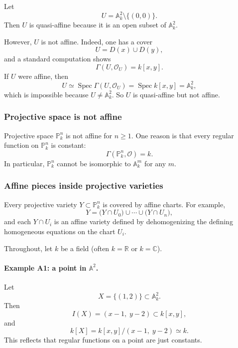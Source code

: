 \documentclass[12pt,a4paper]{article}
\theoremstyle{plain}
\theoremstyle{definition}      %
\begin{document}
Let
\[
U=\mathbb A^2_k\setminus\{(0,0)\}.
\]
Then \(U\) is quasi-affine because it is an open subset of \(\mathbb A^2_k\).

However, \(U\) is not affine.
Indeed, one has a cover
\[
U=D(x)\cup D(y),
\]
and a standard computation shows
\[
\Gamma(U,\mathcal O_U)=k[x,y].
\]
If \(U\) were affine, then
\[
U\simeq \operatorname{Spec}\Gamma(U,\mathcal O_U)=\operatorname{Spec}k[x,y]=\mathbb A^2_k,
\]
which is impossible because \(U\neq \mathbb A^2_k\).
So \(U\) is quasi-affine but not affine.

\subsubsection*{Projective space is not affine}

Projective space \(\mathbb P^n_k\) is not affine for \(n\ge 1\).
One reason is that every regular function on \(\mathbb P^n_k\) is constant:
\[
\Gamma(\mathbb P^n_k,\mathcal O)=k.
\]
In particular, \(\mathbb P^n_k\) cannot be isomorphic to \(\mathbb A^m_k\) for any \(m\).

\subsubsection*{Affine pieces inside projective varieties}

Every projective variety \(Y\subset \mathbb P^n_k\) is covered by affine charts.
For example,
\[
Y=\bigl(Y\cap U_0\bigr)\cup\cdots\cup\bigl(Y\cap U_n\bigr),
\]
and each \(Y\cap U_i\) is an affine variety defined by dehomogenizing the defining homogeneous equations on the chart \(U_i\).



Throughout, let \(k\) be a field (often \(k=\mathbb R\) or \(k=\mathbb C\)).

\paragraph{Example A1: a point in \(\mathbb A^2\).}
Let
\[
X=\{(1,2)\}\subset \mathbb A^2_k.
\]
Then
\[
I(X)=(x-1,\;y-2)\subset k[x,y],
\]
and
\[
k[X]=k[x,y]/(x-1,\;y-2)\simeq k.
\]
This reflects that regular functions on a point are just constants.
\end{document}
